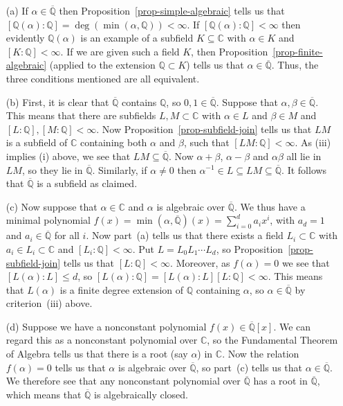 \documentclass{amsart}
\newcommand{\Q}         {{\mathbb{Q}}}
\newcommand{\C}         {{\mathbb{C}}}
\newcommand{\al}        {\alpha}
\newcommand{\bt}        {\beta}
\newcommand{\ov}[1]     {\overline{#1}}
\newcommand{\sse}       {\subseteq}
\renewcommand{\:}{\colon}
\newenvironment{solution}{\SolutionInline}{\endSolutionInline}
\theoremstyle{definition}
\renewenvironment{solution}{\SolutionAtEnd}{\endSolutionAtEnd}
\begin{document}
\begin{solution}
 \begin{itemize}
  \item[(a)] If $\al\in\ov{\Q}$ then
   Proposition~\ref{prop-simple-algebraic} tells us that
   $[\Q(\al):\Q]=\deg(\min(\al,\Q))<\infty$.  If $[\Q(\al):\Q]<\infty$
   then evidently $\Q(\al)$ is an example of a subfield $K\sse\C$ with
   $\al\in K$ and $[K:\Q]<\infty$.  If we are given such a field $K$,
   then Proposition~\ref{prop-finite-algebraic} (applied to the
   extension $\Q\subset K$) tells us that $\al\in\ov{\Q}$.  Thus, the
   three conditions mentioned are all equivalent.
  \item[(b)] First, it is clear that $\ov{\Q}$ contains $\Q$, so
   $0,1\in\ov{\Q}$.  Suppose that $\al,\bt\in\ov{\Q}$.  This means
   that there are subfields $L,M\subset\C$ with $\al\in L$ and
   $\bt\in M$ and $[L:\Q],[M:\Q]<\infty$.  Now
   Proposition~\ref{prop-subfield-join} tells us that $LM$ is a
   subfield of $\C$ containing both $\al$ and $\bt$, such that
   $[LM:\Q]<\infty$.  As (iii) implies (i) above, we see that
   $LM\sse\ov{\Q}$.  Now $\al+\bt$, $\al-\bt$ and $\al\bt$ all lie in
   $LM$, so they lie in $\ov{\Q}$.  Similarly, if $\al\neq 0$ then
   $\al^{-1}\in L\sse LM\sse\ov{\Q}$.  It follows that $\ov{\Q}$ is a
   subfield as claimed.
  \item[(c)] Now suppose that $\al\in\C$ and $\al$ is algebraic over
   $\ov{\Q}$.  We thus have a minimal polynomial
   $f(x)=\min(\al,\ov{\Q})(x)=\sum_{i=0}^da_ix^i$, with $a_d=1$ and
   $a_i\in\ov{\Q}$ for all $i$.  Now part~(a) tells us that there
   exists a field $L_i\subset\C$ with $a_i\in L_i\subset\C$ and
   $[L_i:\Q]<\infty$.  Put $L=L_0L_1\dotsb L_d$, so
   Proposition~\ref{prop-subfield-join} tells us that
   $[L:\Q]<\infty$.  Moreover, as $f(\al)=0$ we see that
   $[L(\al):L]\leq d$, so $[L(\al):\Q]=[L(\al):L][L:\Q]<\infty$.  This
   means that $L(\al)$ is a finite degree extension of $\Q$ containing
   $\al$, so $\al\in\ov{\Q}$ by criterion~(iii) above.
  \item[(d)] Suppose we have a nonconstant polynomial
   $f(x)\in\ov{\Q}[x]$.  We can regard this as a nonconstant polynomial
   over $\C$, so the Fundamental Theorem of Algebra tells us that
   there is a root (say $\al$) in $\C$.  Now the relation $f(\al)=0$
   tells us that $\al$ is algebraic over $\ov{\Q}$, so part~(c) tells
   us that $\al\in\ov{\Q}$.  We therefore see that any nonconstant
   polynomial over $\ov{\Q}$ has a root in $\ov{\Q}$, which means that
   $\ov{\Q}$ is algebraically closed.
 \end{itemize}
\end{solution}
\end{document}
